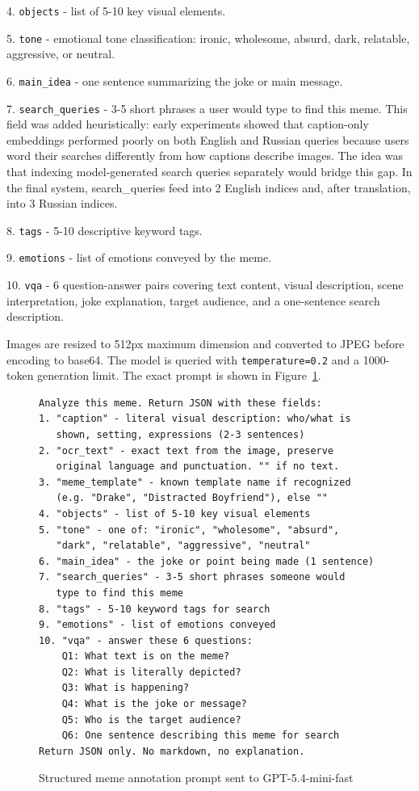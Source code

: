 \documentclass[a4paper,12pt]{article}
\begin{document}
4. \texttt{objects} - list of 5-10 key visual elements.

5. \texttt{tone} - emotional tone classification: ironic, wholesome, absurd, dark, relatable, aggressive, or neutral.

6. \texttt{main\_idea} - one sentence summarizing the joke or main message.

7. \texttt{search\_queries} - 3-5 short phrases a user would type to find this meme. This field was added heuristically: early experiments showed that caption-only embeddings performed poorly on both English and Russian queries because users word their searches differently from how captions describe images. The idea was that indexing model-generated search queries separately would bridge this gap. In the final system, search\_queries feed into 2 English indices and, after translation, into 3 Russian indices.

8. \texttt{tags} - 5-10 descriptive keyword tags.

9. \texttt{emotions} - list of emotions conveyed by the meme.

10. \texttt{vqa} - 6 question-answer pairs covering text content, visual description, scene interpretation, joke explanation, target audience, and a one-sentence search description.

Images are resized to 512px maximum dimension and converted to JPEG before encoding to base64. The model is queried with \texttt{temperature=0.2} and a 1000-token generation limit. The exact prompt is shown in Figure~\ref{fig:annotation_prompt}.

\begin{figure}[H]
\centering
\small
\begin{verbatim}
Analyze this meme. Return JSON with these fields:
1. "caption" - literal visual description: who/what is
   shown, setting, expressions (2-3 sentences)
2. "ocr_text" - exact text from the image, preserve
   original language and punctuation. "" if no text.
3. "meme_template" - known template name if recognized
   (e.g. "Drake", "Distracted Boyfriend"), else ""
4. "objects" - list of 5-10 key visual elements
5. "tone" - one of: "ironic", "wholesome", "absurd",
   "dark", "relatable", "aggressive", "neutral"
6. "main_idea" - the joke or point being made (1 sentence)
7. "search_queries" - 3-5 short phrases someone would
   type to find this meme
8. "tags" - 5-10 keyword tags for search
9. "emotions" - list of emotions conveyed
10. "vqa" - answer these 6 questions:
    Q1: What text is on the meme?
    Q2: What is literally depicted?
    Q3: What is happening?
    Q4: What is the joke or message?
    Q5: Who is the target audience?
    Q6: One sentence describing this meme for search
Return JSON only. No markdown, no explanation.
\end{verbatim}
\caption{Structured meme annotation prompt sent to GPT-5.4-mini-fast}
\label{fig:annotation_prompt}
\end{figure}
\end{document}
